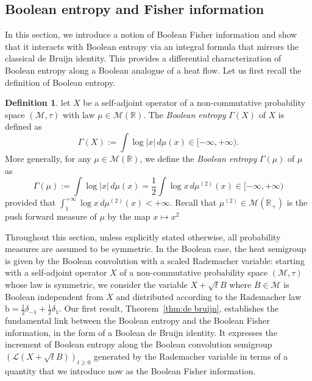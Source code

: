 \documentclass[10pt, reqno]{amsart}
\numberwithin{equation}{section}
\theoremstyle{definition}
\newtheorem{definition}{Definition}[section]
\theoremstyle{plain}
\theoremstyle{remark}
\newcommand{\R}{\mathbb{R}}
\newcommand{\1}{\mathbbm{1}}
\begin{document}
\subsection{Boolean entropy and Fisher information}\label{Sec1:booleanentropy}
	In this section, we introduce a notion of Boolean Fisher information and show that it interacts with Boolean entropy via an integral formula that mirrors the classical de Bruijn identity. This provides a differential characterization of Boolean entropy along a Boolean analogue of a heat flow. Let us first recall the definition of Boolean entropy.
\begin{definition}
let $X$ be a self-adjoint operator of a non-commutative probability space $(\mathcal{M},\tau)$ with law $\mu\in\mathcal{M}(\R)$. The \textit{Boolean entropy} $\Gamma(X)$ of $X$ is defined as
\begin{equation}\label{def:entropy}
		\Gamma(X):=\int \log |x|\,d\mu(x)\in [-\infty,+\infty).
	\end{equation}
    More generally, for any $\mu \in\mathcal{M}(\R)$, we define the \textit{Boolean entropy} $\Gamma(\mu)$ of $\mu$ as
\begin{equation*}
		\Gamma(\mu):=\int \log |x|\,d\mu(x) = \frac{1}{2}\int \log x\,d\mu^{(2)}(x)\in [-\infty,+\infty)
	\end{equation*} provided that $\int_1^{+\infty}\log x\,d\mu^{(2)}(x)<+\infty$. Recall that $\mu^{(2)}\in \mathcal{M}(\R_+)$ is the push forward measure of $\mu$ by the map $x\mapsto x^2$
\end{definition}

Throughout this section, unless explicitly stated otherwise, all probability measures are assumed to be symmetric. In the Boolean case, the heat semigroup is given by the Boolean convolution with a scaled Rademacher variable: starting with a self-adjoint operator $X$ of a non-commutative probability space $(\mathcal{M},\tau)$ whose law is symmetric, we consider the variable $X+\sqrt{t}B$ where $B\in \mathcal{M}$ is Boolean independent from $X$ and distributed according to the Rademacher law $\mathrm{b}= \frac{1}{2}\delta_{-1}+\frac{1}{2}\delta_1.$ Our first result, Theorem~\ref{thm:de bruijn}, establishes the fundamental link between the Boolean entropy and the Boolean Fisher information, in the form of a Boolean de Bruijn identity. It expresses the increment of Boolean entropy along the Boolean convolution semigroup $(\mathcal{L}(X+\sqrt{t}B))_{t\geq 0}$ generated by the Rademacher variable in terms of a quantity that we introduce now as the Boolean Fisher information.
\end{document}
